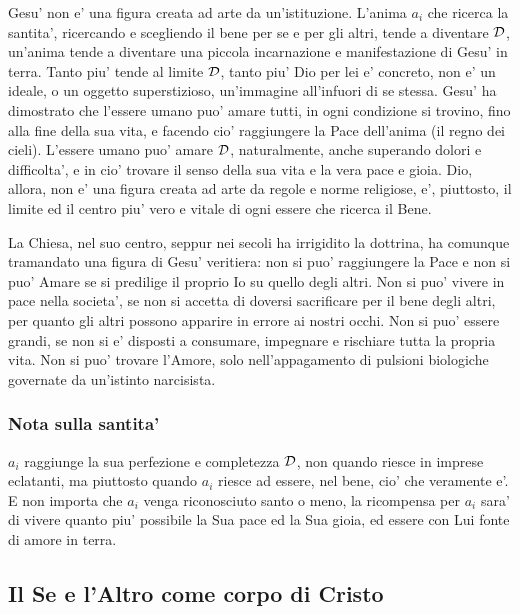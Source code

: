 Gesu' non e' una figura creata ad arte da un'istituzione.
L'anima $a_i$ che ricerca la santita', ricercando e scegliendo il bene per se e per gli altri, tende a diventare $\mathcal{D}$, un'anima tende a diventare una piccola incarnazione e manifestazione di Gesu' in terra. Tanto piu' tende al limite $\mathcal{D}$, tanto piu' Dio per lei e' concreto, non e' un ideale, o un oggetto superstizioso, un'immagine all'infuori di se stessa. Gesu' ha dimostrato che l'essere umano puo' amare tutti, in ogni condizione si trovino, fino alla fine della sua vita, e facendo cio' raggiungere la Pace dell'anima (il regno dei cieli). L'essere umano puo' amare $\mathcal{D}$, naturalmente, anche superando dolori e difficolta', e in cio' trovare il senso della sua vita e la vera pace e gioia. Dio, allora, non e' una figura creata ad arte da regole e norme religiose, e', piuttosto, il limite ed il centro piu' vero e vitale di ogni essere che ricerca il Bene. 

La Chiesa, nel suo centro, seppur nei secoli ha irrigidito la dottrina, ha comunque tramandato una figura di Gesu' veritiera: non si puo' raggiungere la Pace e non si puo' Amare se si predilige il proprio Io su quello degli altri. Non si puo' vivere in pace nella societa', se non si accetta di doversi sacrificare per il bene degli altri, per quanto gli altri possono apparire in errore ai nostri occhi. Non si puo' essere grandi, se non si e' disposti a consumare, impegnare e rischiare tutta la propria vita. Non si puo' trovare l'Amore, solo nell'appagamento di pulsioni biologiche governate da un'istinto narcisista.

\subsubsection{Nota sulla santita'}
$a_i$ raggiunge la sua perfezione e completezza $\mathcal{D}$, non quando riesce in imprese eclatanti, ma piuttosto quando $a_i$ riesce ad essere, nel bene, cio' che veramente e'. E non importa che $a_i$ venga riconosciuto santo o meno, la ricompensa per $a_i$ sara' di vivere quanto piu' possibile la Sua pace ed la Sua gioia, ed essere con Lui fonte di amore in terra.

\subsection{Il Se e l'Altro come corpo di Cristo}

